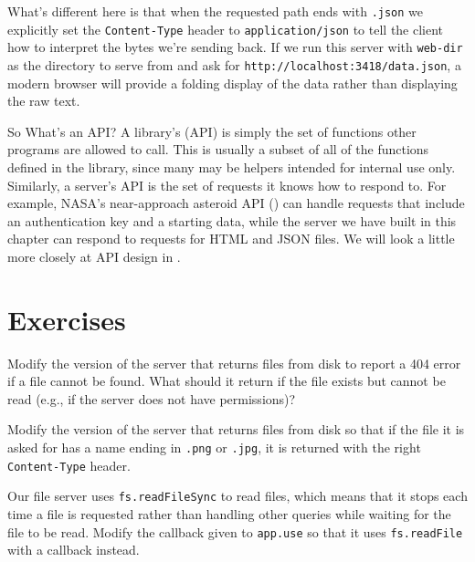 What's different here is that when the requested path ends with \texttt{.json}
we explicitly set the \texttt{Content-Type} header to \texttt{application/json}
to tell the client how to interpret the bytes we're sending back.
If we run this server with \texttt{web-dir} as the directory to serve from
and ask for \texttt{http://localhost:3418/data.json},
a modern browser will provide a folding display of the data
rather than displaying the raw text.

\begin{aside}{So What's an API?}
  A library's  (API) is simply
  the set of functions other programs are allowed to call.
  This is usually a subset of all of the functions defined in the library,
  since many may be helpers intended for internal use only.
  Similarly,
  a server's API is the set of requests it knows how to respond to.
  For example,
  NASA's near-approach asteroid API ()
  can handle requests that include an authentication key and a starting data,
  while the server we have built in this chapter
  can respond to requests for HTML and JSON files.
  We will look a little more closely at API design in .
\end{aside}

\section{Exercises}\label{s:server-exercises}


Modify the version of the server that returns files from disk
to report a 404 error if a file cannot be found.
What should it return if the file exists but cannot be read
(e.g., if the server does not have permissions)?


Modify the version of the server that returns files from disk
so that if the file it is asked for has a name ending in \texttt{.png} or \texttt{.jpg},
it is returned with the right \texttt{Content-Type} header.


Our file server uses \texttt{fs.readFileSync} to read files,
which means that it stops each time a file is requested
rather than handling other queries while waiting for the file to be read.
Modify the callback given to \texttt{app.use} so that it uses \texttt{fs.readFile} with a callback instead.

